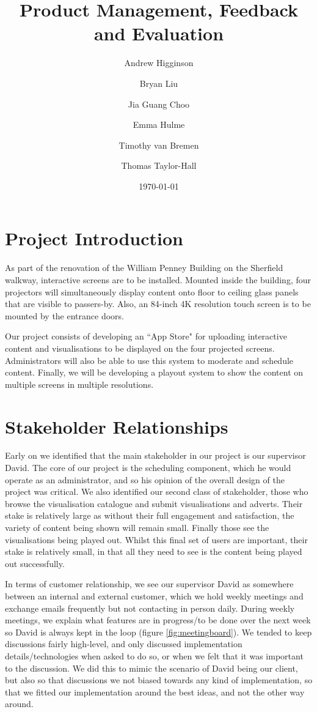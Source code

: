\documentclass[a4paper]{article}
\begin{document}
\title{Product Management, Feedback and Evaluation}
\author{Andrew Higginson \and Bryan Liu \and Jia Guang Choo \and Emma Hulme \and 
Timothy van Bremen \and Thomas Taylor-Hall}
\date{\today}
\maketitle

\setcounter{table}{0}
\linespread{1.15}

\section{Project Introduction}
As part of the renovation of the William Penney Building on the Sherfield 
walkway, interactive screens are to be installed. Mounted inside the building,
four projectors will simultaneously display content onto floor to ceiling glass
panels that are visible to passers-by. Also, an 84-inch 4K resolution touch 
screen is to be mounted by the entrance doors. 

Our project consists of developing an ``App Store" for uploading interactive 
content and visualisations to be displayed on the four projected screens. 
Administrators will also be able to use this system to moderate and schedule 
content. Finally, we will be developing a playout system to show the content 
on multiple screens in multiple resolutions.

\section{Stakeholder Relationships}
Early on we identified that the main stakeholder in our project is
our supervisor David. The core of our project is the scheduling component,
which he would operate as an administrator, and so his opinion of the overall
design of the project was critical. We also identified our second class of
stakeholder, those who browse the visualisation catalogue and submit
visualisations and adverts. Their stake is relatively large as without
their full engagement and satisfaction, the variety of content being
shown will remain small. Finally those see the visualisations being
played out. Whilst this final set of users are important, their stake is
relatively small, in that all they need to see is the content being played
out successfully.

In terms of customer relationship, we see our supervisor David as somewhere 
between an internal and external customer, which we hold weekly meetings
and exchange emails frequently but not contacting in person daily. 
During weekly meetings, we explain what features are in progress/to be done
over the next week so David is always kept in the loop (figure 
\ref{fig:meetingboard}). We tended to keep 
discussions fairly high-level, and only discussed implementation 
details/technologies when asked to do so, or when we felt that it was 
important to the discussion. We did this to mimic the scenario of David 
being our client, but also so that discussions we not biased towards any 
kind of implementation, so that we fitted our implementation around the best 
ideas, and not the other way around.
\end{document}
